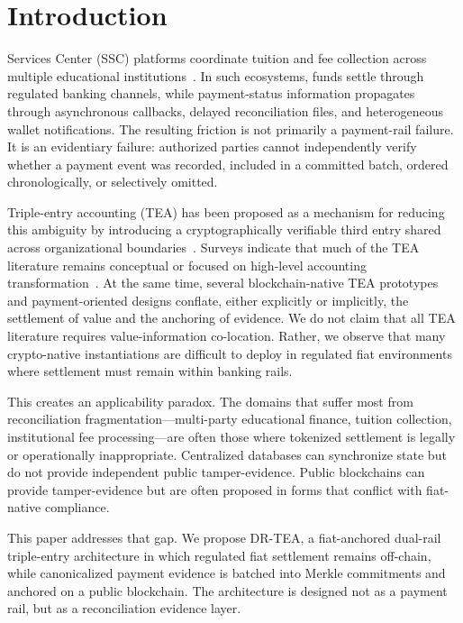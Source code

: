 \documentclass[journal]{IEEEtran}
\begin{document}
\section{Introduction}
 Services Center (SSC) platforms coordinate tuition and fee collection across multiple educational institutions~\cite{le2026ssc}. In such ecosystems, funds settle through regulated banking channels, while payment-status information propagates through asynchronous callbacks, delayed reconciliation files, and heterogeneous wallet notifications. The resulting friction is not primarily a payment-rail failure. It is an evidentiary failure: authorized parties cannot independently verify whether a payment event was recorded, included in a committed batch, ordered chronologically, or selectively omitted.

Triple-entry accounting (TEA) has been proposed as a mechanism for reducing this ambiguity by introducing a cryptographically verifiable third entry shared across organizational boundaries~\cite{grigg2024tea, ibanez2025tea}. Surveys indicate that much of the TEA literature remains conceptual or focused on high-level accounting transformation~\cite{sarwar2023blockchains, sarwar2026survey, joseph2023tea}. At the same time, several blockchain-native TEA prototypes and payment-oriented designs conflate, either explicitly or implicitly, the settlement of value and the anchoring of evidence. We do not claim that all TEA literature requires value-information co-location. Rather, we observe that many crypto-native instantiations are difficult to deploy in regulated fiat environments where settlement must remain within banking rails.

This creates an applicability paradox. The domains that suffer most from reconciliation fragmentation---multi-party educational finance, tuition collection, institutional fee processing---are often those where tokenized settlement is legally or operationally inappropriate. Centralized databases can synchronize state but do not provide independent public tamper-evidence. Public blockchains can provide tamper-evidence but are often proposed in forms that conflict with fiat-native compliance.

This paper addresses that gap. We propose DR-TEA, a fiat-anchored dual-rail triple-entry architecture in which regulated fiat settlement remains off-chain, while canonicalized payment evidence is batched into Merkle commitments and anchored on a public blockchain. The architecture is designed not as a payment rail, but as a reconciliation evidence layer.
\end{document}
